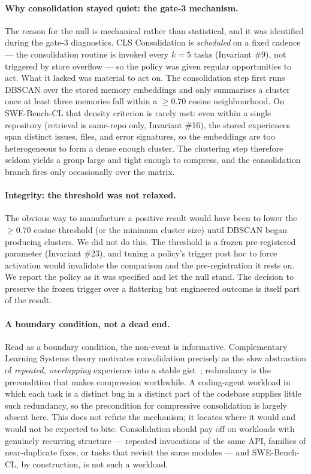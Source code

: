 \paragraph{Why consolidation stayed quiet: the gate-3 mechanism.}
The reason for the null is mechanical rather than statistical, and it was identified during
the gate-3 diagnostics. CLS Consolidation is \emph{scheduled} on a fixed cadence --- the
consolidation routine is invoked every $k=5$ tasks (Invariant \#9), not triggered by store
overflow --- so the policy was given regular opportunities to act. What it lacked was
material to act on. The consolidation step first runs DBSCAN over the stored memory
embeddings and only summarises a cluster once at least three memories fall within a
$\geq 0.70$ cosine neighbourhood. On SWE-Bench-CL that density criterion is rarely met:
even within a single repository (retrieval is same-repo only, Invariant \#16), the stored
experiences span distinct issues, files, and error signatures, so the embeddings are too
heterogeneous to form a dense enough cluster. The clustering step therefore seldom yields a
group large and tight enough to compress, and the consolidation branch fires only
occasionally over the matrix.

\paragraph{Integrity: the threshold was not relaxed.}
The obvious way to manufacture a positive result would have been to lower the $\geq 0.70$
cosine threshold (or the minimum cluster size) until DBSCAN began producing clusters. We
did not do this. The threshold is a frozen pre-registered parameter (Invariant \#23), and
tuning a policy's trigger post hoc to force activation would invalidate the comparison and
the pre-registration it rests on. We report the policy as it was specified and let the null
stand. The decision to preserve the frozen trigger over a flattering but engineered
outcome is itself part of the result.

\paragraph{A boundary condition, not a dead end.}
Read as a boundary condition, the non-event is informative. Complementary Learning Systems
theory motivates consolidation precisely as the slow abstraction of \emph{repeated,
overlapping} experience into a stable gist~\cite{mcclelland1995}; redundancy is the
precondition that makes compression worthwhile. A coding-agent workload in which each task
is a distinct bug in a distinct part of the codebase supplies little such redundancy, so
the precondition for compressive consolidation is largely absent here. This does not refute
the mechanism; it locates where it would and would not be expected to bite. Consolidation
should pay off on workloads with genuinely recurring structure --- repeated invocations of
the same API, families of near-duplicate fixes, or tasks that revisit the same modules ---
and SWE-Bench-CL, by construction, is not such a workload.

